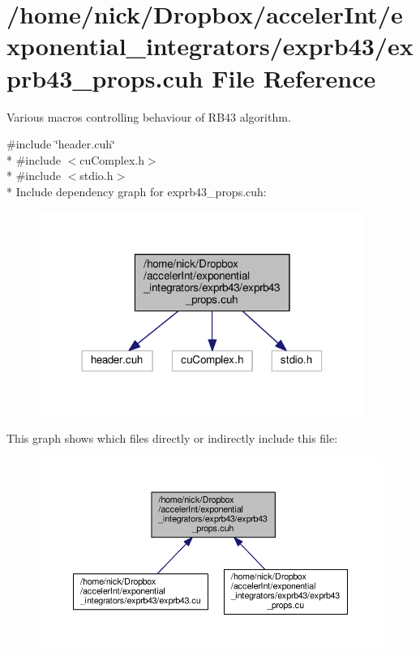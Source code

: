 \hypertarget{exprb43__props_8cuh}{}\section{/home/nick/\+Dropbox/acceler\+Int/exponential\+\_\+integrators/exprb43/exprb43\+\_\+props.cuh File Reference}
\label{exprb43__props_8cuh}


Various macros controlling behaviour of R\+B43 algorithm.  


{\ttfamily \#include \char`\"{}header.\+cuh\char`\"{}}\\*
{\ttfamily \#include $<$cu\+Complex.\+h$>$}\\*
{\ttfamily \#include $<$stdio.\+h$>$}\\*
Include dependency graph for exprb43\+\_\+props.\+cuh\+:
\nopagebreak
\begin{figure}[H]
\begin{center}
\leavevmode
\includegraphics[width=302pt]{exprb43__props_8cuh__incl}
\end{center}
\end{figure}
This graph shows which files directly or indirectly include this file\+:
\nopagebreak
\begin{figure}[H]
\begin{center}
\leavevmode
\includegraphics[width=350pt]{exprb43__props_8cuh__dep__incl}
\end{center}
\end{figure}
